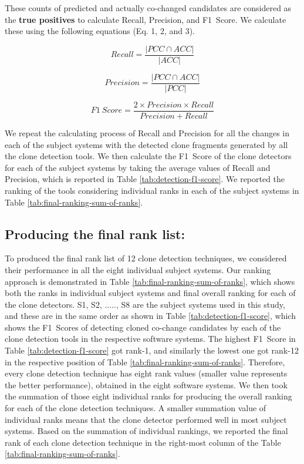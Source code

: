\documentclass[review]{elsarticle}
\begin{document}
These counts of predicted and actually co-changed candidates are considered as the \textbf{true positives} to calculate Recall, Precision, and F1~Score. We calculate these using the following equations (Eq. 1, 2, and 3). 

\begin{equation}
    Recall = \frac{|PCC \cap ACC|}{|ACC|}
\end{equation}

\begin{equation}
    Precision = \frac{|PCC \cap ACC|}{|PCC|}
\end{equation}

\begin{equation}
\label{eq-f1-score}
    F1~Score = \frac{2 \times Precision \times Recall}{Precision + Recall}
\end{equation}

\vspace{1mm}
We repeat the calculating process of Recall and Precision for all the changes in each of the subject systems with the detected clone fragments generated by all the clone detection tools. We then calculate the F1~Score of the clone detectors for each of the subject systems by taking the average values of Recall and Precision, which is reported in Table \ref{tab:detection-f1-score}. We reported the ranking of the tools considering individual ranks in each of the subject systems in Table \ref{tab:final-ranking-sum-of-ranks}.

\subsection{Producing the final rank list:} To produced the final rank list of 12 clone detection techniques, we considered their performance in all the eight individual subject systems. Our ranking approach is demonstrated in Table \ref{tab:final-ranking-sum-of-ranks}, which shows both the ranks in individual subject systems and final overall ranking for each of the clone detectors. S1, S2, ....., S8 are the subject systems used in this study, and these are in the same order as shown in Table \ref{tab:detection-f1-score}, which shows the F1~Scores of detecting cloned co-change candidates by each of the clone detection tools in the respective software systems. The highest F1~Score in Table \ref{tab:detection-f1-score} got rank-1, and similarly the lowest one got rank-12 in the respective position of Table \ref{tab:final-ranking-sum-of-ranks}. Therefore, every clone detection technique has eight rank values (smaller value represents the better performance), obtained in the eight software systems. We then took the summation of those eight individual ranks for producing the overall ranking for each of the clone detection techniques. A smaller summation value of individual ranks means that the clone detector performed well in most subject systems. Based on the summation of individual rankings, we reported the final rank of each clone detection technique in the right-most column of the Table \ref{tab:final-ranking-sum-of-ranks}. 
\end{document}
